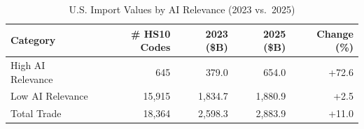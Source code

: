 \begin{table}[htbp]
\centering
\caption{U.S. Import Values by AI Relevance (2023 vs.\ 2025)}
\label{tab:trade_by_relevance}
\setlength{\tabcolsep}{4.5mm}
\renewcommand{\arraystretch}{1.60}
\begin{tabular}{lrrrr}
\toprule
Category & \# HS10 Codes & 2023 (\$B) & 2025 (\$B) & Change (\%) \\
\midrule
High AI Relevance & 645 & 379.0 & 654.0 & +72.6 \\
Low AI Relevance & 15,915 & 1,834.7 & 1,880.9 & +2.5 \\
\midrule
Total Trade & 18,364 & 2,598.3 & 2,883.9 & +11.0 \\
\bottomrule
\end{tabular}
\end{table}
